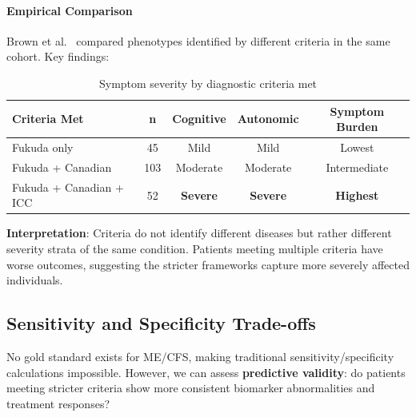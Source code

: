 \paragraph{Empirical Comparison}
Brown et al.~\cite{Brown2013phenotypes} compared phenotypes identified by different criteria in the same cohort. Key findings:

\begin{table}[htbp]
\centering
\caption{Symptom severity by diagnostic criteria met}
\label{tab:criteria-severity}
\begin{tabular}{lcccc}
\toprule
\textbf{Criteria Met} & \textbf{n} & \textbf{Cognitive} & \textbf{Autonomic} & \textbf{Symptom Burden} \\
\midrule
Fukuda only & 45 & Mild & Mild & Lowest \\
Fukuda + Canadian & 103 & Moderate & Moderate & Intermediate \\
Fukuda + Canadian + ICC & 52 & \textbf{Severe} & \textbf{Severe} & \textbf{Highest} \\
\bottomrule
\end{tabular}
\end{table}

\textbf{Interpretation}: Criteria do not identify different diseases but rather different severity strata of the same condition. Patients meeting multiple criteria have worse outcomes, suggesting the stricter frameworks capture more severely affected individuals.

\subsection{Sensitivity and Specificity Trade-offs}

No gold standard exists for ME/CFS, making traditional sensitivity/specificity calculations impossible. However, we can assess \textbf{predictive validity}: do patients meeting stricter criteria show more consistent biomarker abnormalities and treatment responses?

